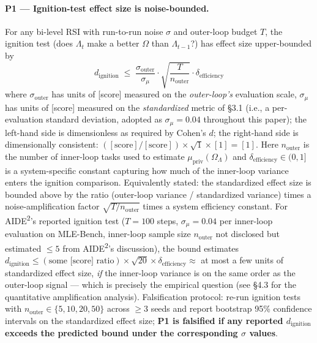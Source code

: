 \paragraph{P1 --- Ignition-test effect size is noise-bounded.}
For any bi-level RSI with run-to-run noise $\sigma$ and outer-loop budget $T$, the ignition test (does $\Lambda_t$ make a better $\Omega$ than $\Lambda_{t-1}$?) has effect size upper-bounded by
\[
d_{\text{ignition}} \;\le\; \frac{\sigma_{\text{outer}}}{\sigma_\mu} \cdot \sqrt{\frac{T}{n_{\text{outer}}}} \cdot \delta_{\text{efficiency}}
\]
where $\sigma_{\text{outer}}$ has units of [score] measured on the \emph{outer-loop's} evaluation scale, $\sigma_\mu$ has units of [score] measured on the \emph{standardized} metric of \S3.1 (i.e., a per-evaluation standard deviation, adopted as $\sigma_\mu = 0.04$ throughout this paper); the left-hand side is dimensionless as required by Cohen's $d$; the right-hand side is dimensionally consistent: $([\text{score}]/[\text{score}]) \times \sqrt{1} \times [1] = [1]$. Here $n_{\text{outer}}$ is the number of inner-loop tasks used to estimate $\mu_{\text{priv}}(\Omega_\Lambda)$ and $\delta_{\text{efficiency}} \in (0, 1]$ is a system-specific constant capturing how much of the inner-loop variance enters the ignition comparison. Equivalently stated: the standardized effect size is bounded above by the ratio (outer-loop variance / standardized variance) times a noise-amplification factor $\sqrt{T/n_{\text{outer}}}$ times a system efficiency constant. For AIDE\textsuperscript{2}'s reported ignition test ($T = 100$ steps, $\sigma_\mu = 0.04$ per inner-loop evaluation on MLE-Bench, inner-loop sample size $n_{\text{outer}}$ not disclosed but estimated $\leq 5$ from AIDE\textsuperscript{2}'s discussion), the bound estimates $d_{\text{ignition}} \leq (\text{some [score] ratio}) \times \sqrt{20} \times \delta_{\text{efficiency}} \approx$ at most a few units of standardized effect size, \textit{if} the inner-loop variance is on the same order as the outer-loop signal --- which is precisely the empirical question (see \S4.3 for the quantitative amplification analysis). Falsification protocol: re-run ignition tests with $n_{\text{outer}} \in \{5, 10, 20, 50\}$ across $\geq 3$ seeds and report bootstrap 95\% confidence intervals on the standardized effect size; \textbf{P1 is falsified if any reported $d_{\text{ignition}}$ exceeds the predicted bound under the corresponding $\sigma$ values}.

